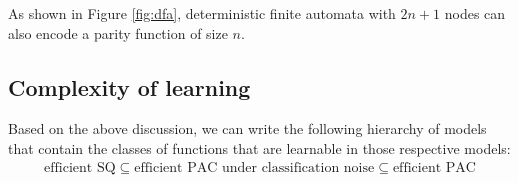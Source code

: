 As shown in Figure \ref{fig:dfa}, deterministic finite automata with $2n+1$ nodes can also encode a parity function of size $n$.


\subsection{Complexity of learning}
Based on the above discussion, we can write the following hierarchy of models that contain the classes of functions that are learnable in those respective models:
\begin{align*}
    \text{efficient SQ} \subseteq \text{efficient PAC under classification noise} \subseteq \text{efficient PAC}
\end{align*}
